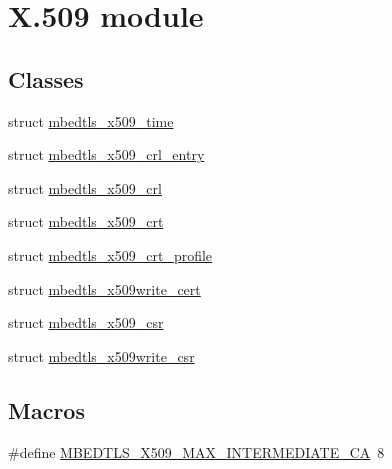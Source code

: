 \hypertarget{group__x509__module}{\section{X.509 module}
\label{group__x509__module}
}
\subsection*{Classes}
\begin{DoxyCompactItemize}
\item 
struct \hyperlink{structmbedtls__x509__time}{mbedtls\-\_\-x509\-\_\-time}
\item 
struct \hyperlink{structmbedtls__x509__crl__entry}{mbedtls\-\_\-x509\-\_\-crl\-\_\-entry}
\item 
struct \hyperlink{structmbedtls__x509__crl}{mbedtls\-\_\-x509\-\_\-crl}
\item 
struct \hyperlink{structmbedtls__x509__crt}{mbedtls\-\_\-x509\-\_\-crt}
\item 
struct \hyperlink{structmbedtls__x509__crt__profile}{mbedtls\-\_\-x509\-\_\-crt\-\_\-profile}
\item 
struct \hyperlink{structmbedtls__x509write__cert}{mbedtls\-\_\-x509write\-\_\-cert}
\item 
struct \hyperlink{structmbedtls__x509__csr}{mbedtls\-\_\-x509\-\_\-csr}
\item 
struct \hyperlink{structmbedtls__x509write__csr}{mbedtls\-\_\-x509write\-\_\-csr}
\end{DoxyCompactItemize}
\subsection*{Macros}
\begin{DoxyCompactItemize}
\item 
\#define \hyperlink{group__x509__module_gab98caf7dfede54b5c576b5a27a5c6a6a}{M\-B\-E\-D\-T\-L\-S\-\_\-\-X509\-\_\-\-M\-A\-X\-\_\-\-I\-N\-T\-E\-R\-M\-E\-D\-I\-A\-T\-E\-\_\-\-C\-A}~8
\end{DoxyCompactItemize}
